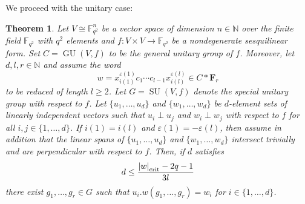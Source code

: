 \documentclass[a4paper,12pt]{amsproc}
\newcommand{\norm}[1]{\left\lvert#1\right\rvert}%
\DeclareMathOperator{\SU}{SU}%
\DeclareMathOperator{\GU}{GU}%
\theoremstyle{plain}
\newtheorem{theorem}[definition]{Theorem}
\theoremstyle{definition}
\begin{document}
We proceed with the unitary case:
	
\begin{theorem}\label{thm:untry_cse}
Let $V\cong\mathbb{F}_{q^2}^n$ be a vector space of dimension $n\in\mathbb{N}$ over the finite field $\mathbb{F}_{q^2}$ with $q^2$ elements and $f\colon V\times V\to\mathbb{F}_{q^2}$ be a nondegenerate sesquilinear form. Set $C=\GU(V,f)$ to be the general unitary group of $f$. Moreover, let $d,l,r\in\mathbb{N}$ and assume the word 
$$
w=x_{i(1)}^{\varepsilon(1)}c_1\cdots c_{l-1}x_{i(l)}^{\varepsilon(l)}\in C\ast\mathbf{F}_r
$$ 
to be reduced of length $l\geq 2$. Let $G =\SU(V,f)$ denote the special unitary group with respect to $f$. Let $\{u_1,\ldots,u_d\}$ and $\{w_1,\ldots,w_d\}$ be $d$-element sets of linearly independent vectors such that $u_i\perp u_j$ and $w_i\perp w_j$ with respect to $f$ for all $i,j\in\{1,\ldots,d\}$. If $i(1)=i(l)$ and $\varepsilon(1) = -\varepsilon(l)$, then assume in addition that the linear spans of $\{u_1,\ldots,u_d\}$ and $\{w_1,\ldots,w_d\}$ intersect trivially and are perpendicular with respect to $f$. Then, if $d$ satisfies
\begin{equation}\label{eq:untry_cs}
d\leq\frac{\norm{w}_{\rm crit}-2q-1}{3l}  
\end{equation}
there exist $g_1,\ldots,g_r\in G$ such that $u_i.w(g_1,\ldots,g_r)=w_i$ for $i\in\{1,\ldots,d\}$.
\end{theorem}
	
\end{document}
